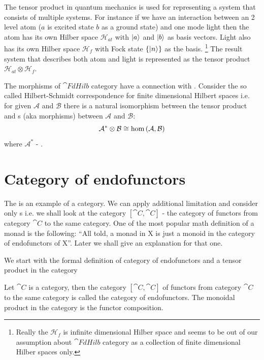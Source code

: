 The tensor product in quantum mechanics is used for
representing a system that consists of multiple systems. For instance
if we have an interaction between an 2 level atom ($a$ is excited
state $b$ as a ground state) and one mode light then the
atom has its own Hilber space $\mathcal{H}_{at}$ with $\ket{a}$ and
$\ket{b}$ as basis 
vectors.  Light also has its own Hilber space $\mathcal{H}_f$ with Fock state
$\{\ket{n}\}$ as the basis.
\footnote{
  Really the $\mathcal{H}_f$ is infinite dimensional Hilber space and
  seems to be out of our assumption about $\cat{FdHilb}$ category as
  a collection of finite dimensional Hilber spaces only.
}
The result system that describes both atom
and light is represented as the tensor product $\mathcal{H}_{at}
\otimes \mathcal{H}_f$.

\begin{remark}
The morphisms of $\cat{FdHilb}$ category have a connection with
. Consider the so called Hilbert-Schmidt
correspondence for finite dimensional Hilbert spaces i.e. for given
$\mathcal{A}$ and $\mathcal{B}$ there is a natural isomorphism between
the tensor product and s (aka morphisms) between
$\mathcal{A}$ and $\mathcal{B}$:
\[
\mathcal{A}^\ast \otimes \mathcal{B} \cong \catmset{\mathcal{A}}{\mathcal{B}}
\]
where $\mathcal{A}^\ast$ - .
\end{remark}

\section{Category of endofunctors}

The  is an example of a category. We can
apply additional limitation and consider only
s i.e. we shall look at the category
$[\cat{C}, \cat{C}]$ - the category of functors from category $\cat{C}$ to
the same category. One of the most popular math definition of a monad
is the following: 
``All told, a monad in X is just a monoid in the category of
endofunctors of X''\cite[p.~138]{bib:maclane98}.
Later we shall give an explanation for that one.

We start with the formal definition of category of endofunctors and a
tensor product in the category
\begin{definition}
\label{def:category_of_endofunctors}
Let $\cat{C}$ is a category, then  the category $[\cat{C}, \cat{C}]$ of
functors from category $\cat{C}$ to the same category is called the
category of endofunctors. The monoidal product in the category is the
functor composition. 
\end{definition}

